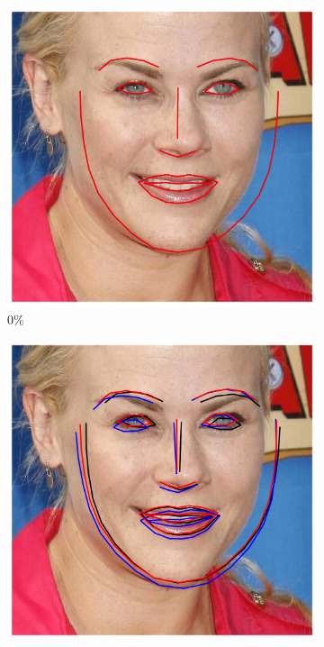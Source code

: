 \begin{figure}[t!]
	\centering
	\begin{subfigure}{0.16\textwidth}
		\includegraphics[width=\textwidth]{figures/ini_0.png}
		\caption{$0\%$}
		\label{fig:ini_0}
	\end{subfigure}
	\begin{subfigure}{0.16\textwidth}
		\includegraphics[width=\textwidth]{figures/ini_1.png}

\end{subfigure}
\end{figure}
